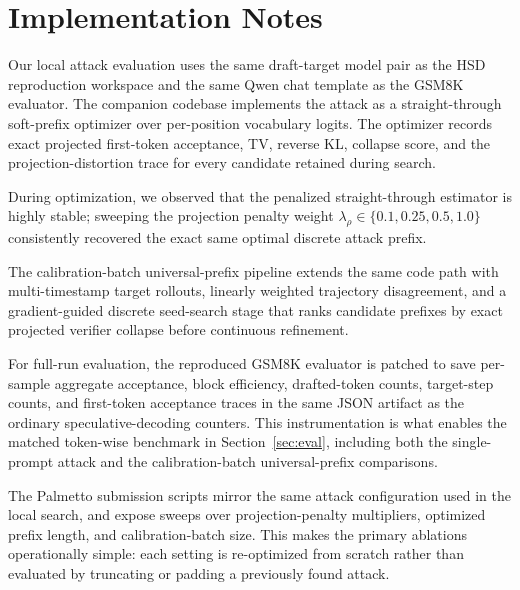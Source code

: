 \appendix

\section{Implementation Notes}

Our local attack evaluation uses the same draft-target model pair as the HSD
reproduction workspace and the same Qwen chat template as the GSM8K evaluator.
The companion codebase implements the attack as a straight-through soft-prefix
optimizer over per-position vocabulary logits. The optimizer records exact
projected first-token acceptance, TV, reverse KL, collapse score, and the
projection-distortion trace for every candidate retained during search.

During optimization, we observed that the penalized straight-through estimator is highly stable; sweeping the projection penalty weight $\lambda_\rho \in \{0.1, 0.25, 0.5, 1.0\}$ consistently recovered the exact same optimal discrete attack prefix.

The calibration-batch universal-prefix pipeline extends the same code path with
multi-timestamp target rollouts, linearly weighted trajectory disagreement, and
a gradient-guided discrete seed-search stage that ranks candidate prefixes by
exact projected verifier collapse before continuous refinement.

For full-run evaluation, the reproduced GSM8K evaluator is patched to save
per-sample aggregate acceptance, block efficiency, drafted-token counts,
target-step counts, and first-token acceptance traces in the same JSON artifact
as the ordinary speculative-decoding counters. This instrumentation is what
enables the matched token-wise benchmark in Section~\ref{sec:eval}, including
both the single-prompt attack and the calibration-batch universal-prefix
comparisons.

The Palmetto submission scripts mirror the same attack configuration used in
the local search, and expose sweeps over projection-penalty multipliers,
optimized prefix length, and calibration-batch size. This makes the primary
ablations operationally simple: each setting is re-optimized from scratch
rather than evaluated by truncating or padding a previously found attack.
